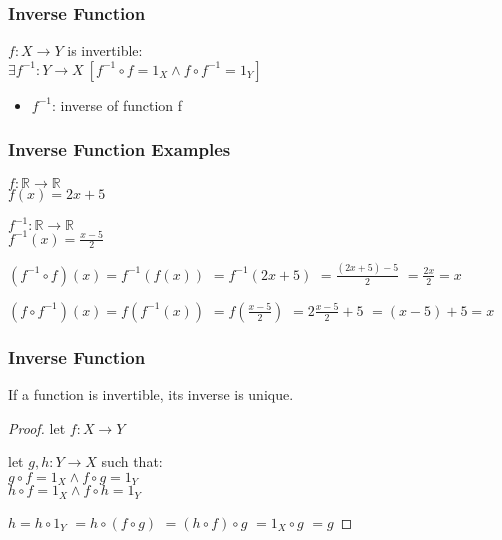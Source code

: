 \documentclass[dvipsnames]{beamer}
\begin{document}
\begin{frame}
  \frametitle{Inverse Function}

  \begin{definition}
    $f: X \rightarrow Y$ is \alert{invertible}:\\
      $\exists f^{-1}: Y \rightarrow X~[f^{-1} \circ f = 1_X
                                      \wedge f \circ f^{-1} = 1_Y]$

    \begin{itemize}
      \item $f^{-1}$: \alert{inverse} of function f
    \end{itemize}
  \end{definition}
\end{frame}

\begin{frame}
  \frametitle{Inverse Function Examples}

  \begin{example}
    $f: \mathbb{R} \rightarrow \mathbb{R}$\\
    $f(x) = 2x + 5$

    \pause
    \bigskip
    $f^{-1}: \mathbb{R} \rightarrow \mathbb{R}$\\
    $f^{-1}(x) = \frac{x - 5}{2}$

    \pause
    \bigskip
    $(f^{-1} \circ f)(x) = f^{-1}(f(x))$
    \pause
    $ = f^{-1}(2x + 5)$
    \pause
    $ = \frac{(2x + 5) - 5}{2}$
    \pause
    $ = \frac{2x}{2} = x$
    \medskip

    \pause
    $(f \circ f^{-1})(x) = f(f^{-1}(x))$
    \pause
    $ = f(\frac{x - 5}{2})$
    \pause
    $ = 2 \frac{x - 5}{2} + 5$
    \pause
    $ = (x - 5) + 5 = x$
  \end{example}
\end{frame}

\begin{frame}
  \frametitle{Inverse Function}

  \begin{theorem}
    If a function is invertible, its inverse is unique.
  \end{theorem}

  \pause
  \begin{proof}
    let $f: X \rightarrow Y$

    \pause
    \medskip
    let $g,h: Y \rightarrow X$ such that:\\
    $g \circ f = 1_X \wedge f \circ g = 1_Y$\\
    $h \circ f = 1_X \wedge f \circ h = 1_Y$

    \pause
    \medskip
    $h = h \circ 1_Y$
    \pause
    $ = h \circ (f \circ g)$
    \pause
    $ = (h \circ f) \circ g$
    \pause
    $ = 1_X \circ g$
    \pause
    $ = g$
  \end{proof}
\end{frame}
\end{document}
